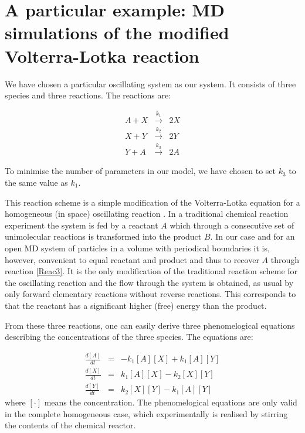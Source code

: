 \section{A particular example: MD simulations of the modified
Volterra-Lotka reaction}
We have chosen a particular oscillating system as our system. It consists of
three species and three reactions. The reactions are:

\begin{eqnarray}
  A + X &\overset{k_1}{\rightarrow}& 2X \label{Reac1} \\
  X + Y &\overset{k_2}{\rightarrow}& 2Y \label{Reac2} \\
  Y + A &\overset{k_3}{\rightarrow}& 2A \label{Reac3}
\end{eqnarray}

To minimise the number of parameters in our model, we have chosen to set $k_3$
to the same value as $k_1$.

This reaction scheme is a simple modification of the Volterra-Lotka
equation for a homogeneous (in space) oscillating reaction
\cite{lotka1} \cite{lotka2}. In 
a traditional chemical reaction experiment the system is fed by a
reactant $A$ which through a consecutive set of unimolecular reactions
is transformed into the product $B$. In our case and for
an open MD system of particles in a volume with pe\-riodi\-cal boundaries
it is, however, convenient to equal reactant and product and thus to
recover $A$ through reaction \ref{Reac3}. It is the
only modification of the traditional reaction scheme for the
oscillating reaction and the flow through the system is obtained, as
usual by only forward elementary reactions without reverse
reactions. This corresponds to that the reactant has a significant
higher (free) energy than the product.

From these three reactions, one can easily derive three phenomelogical 
equations describing the concentrations of the three species. The equations
are:

\begin{eqnarray*}
  \frac{d[A]}{dt} &=& -k_1[A][X] + k_1[A][Y] \\
  \frac{d[X]}{dt} &=& k_1[A][X] - k_2[X][Y] \\
  \frac{d[Y]}{dt} &=& k_2[X][Y] - k_1[A][Y]
\end{eqnarray*}
where $[\cdot]$ means the concentration. The phenomelogical equations are
only valid in the complete homogeneous case, which experimentally is 
realised by stirring the contents of the chemical reactor.

